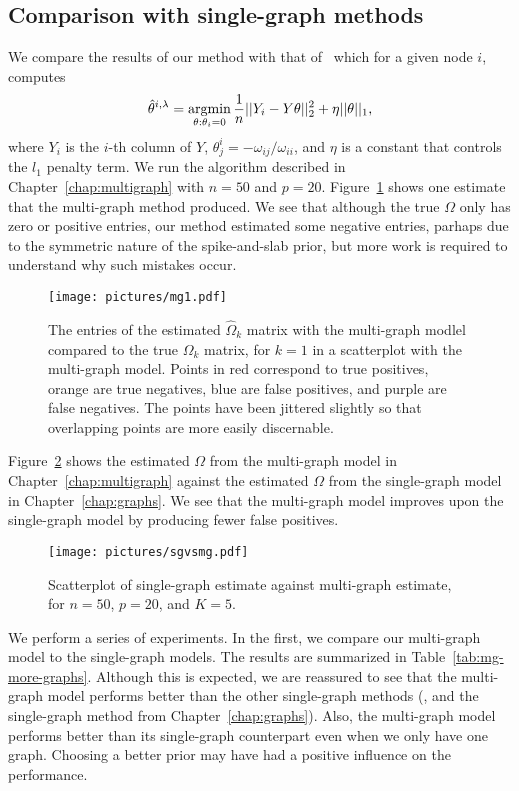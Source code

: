 \documentclass[a4paper, 11pt, oneside]{report}
\DeclareMathOperator{\argmin}{argmin}
\newcommand{\1}{\mathds{1}}
\begin{document}
\subsection{Comparison with single-graph methods}
We compare the results of our method with that of~\citet{mein2006} which for a given node $i$, computes
\[\hat{\theta}^{i, \lambda} = \argmin\displaylimits_{\theta : \theta_i = 0}\frac{1}{n} ||Y_i - Y \theta||_2^2 + \eta ||\theta||_1,\]
where $Y_i$ is the $i$-th column of $Y$, $\theta_j^i = -\omega_{ij}/\omega_{ii}$, and $\eta$ is a constant that controls the $l_1$ penalty term.
We run the algorithm described in Chapter~\ref{chap:multigraph} with $n=50$ and $p=20$.
Figure~\ref{fig:omega-mg} shows one estimate that the multi-graph method produced.
We see that although the true $\Omega$ only has zero or positive entries, our method estimated some negative entries,
parhaps due to the symmetric nature of the spike-and-slab prior, but more work is required to understand why such mistakes occur.
\begin{figure}[bt]
	\centering
	\texttt{[image: pictures/mg1.pdf]}
	\caption{The entries of the estimated $\hat \Omega_k$ matrix with the multi-graph modlel compared to the true $\Omega_k$ matrix, for $k = 1$ in
		a scatterplot with the multi-graph model. Points in red correspond to true positives, orange are true negatives, blue are false positives, and purple are false negatives. The points have been jittered slightly so that overlapping points are more easily discernable.}
	\label{fig:omega-mg}
\end{figure}
Figure~\ref{fig:sgvsmg} shows the estimated $\Omega$ from the multi-graph model in Chapter~\ref{chap:multigraph} against the estimated $\Omega$ from the single-graph model in Chapter~\ref{chap:graphs}.
We see that the multi-graph model improves upon the single-graph model by producing fewer false positives.
\begin{figure}
	\begin{center}
		\texttt{[image: pictures/sgvsmg.pdf]}
	\end{center}
	\caption{Scatterplot of single-graph estimate against multi-graph estimate, for $n=50$, $p=20$, and $K=5$.}
	\label{fig:sgvsmg}
\end{figure}

We perform a series of experiments. In the first, we compare our multi-graph model to the single-graph models.
The results are summarized in Table~\ref{tab:mg-more-graphs}.
Although this is expected, we are reassured to see that the multi-graph model performs better than the other single-graph methods (\cite{mein2006}, and the single-graph method from Chapter~\ref{chap:graphs}).
Also, the multi-graph model performs better than its single-graph counterpart even when we only have one graph.
Choosing a better prior may have had a positive influence on the performance.
\end{document}
